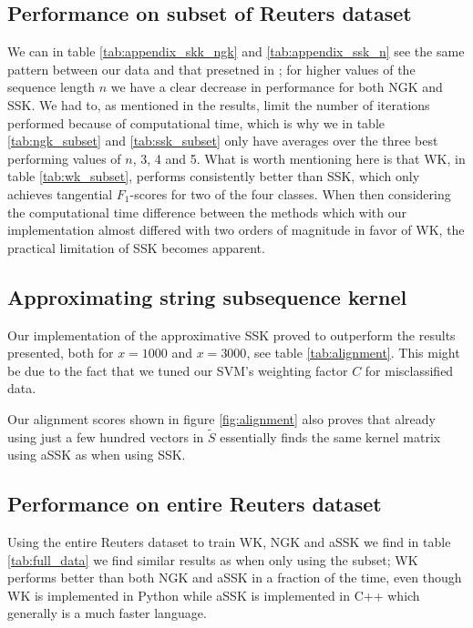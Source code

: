 \subsection{Performance on subset of Reuters dataset}
We can in table \ref{tab:appendix_skk_ngk} and \ref{tab:appendix_ssk_n} see the same pattern between our data and that presetned in \cite{lodhi}; for higher values of the sequence length $ n $ we have a clear decrease in performance for both NGK and SSK. We had to, as mentioned in the results, limit the number of iterations performed because of computational time, which is why we in table \ref{tab:ngk_subset} and \ref{tab:ssk_subset} only have averages over the three best performing values of $ n $, 3, 4 and 5. What is worth mentioning here is that WK, in table \ref{tab:wk_subset}, performs consistently better than SSK, which only achieves tangential $ F_1 $-scores for two of the four classes. When then considering the computational time difference between the methods which with our implementation almost differed with two orders of magnitude in favor of WK, the practical limitation of SSK becomes apparent. 

\subsection{Approximating string subsequence kernel}
Our implementation of the approximative SSK proved to outperform the results \cite{lodhi} presented, both for $ x=1000 $ and $ x=3000 $, see table \ref{tab:alignment}. This might be due to the fact that we tuned our SVM's weighting factor $ C $ for misclassified data. 

Our alignment scores shown in figure \ref{fig:alignment} also proves that already using just a few hundred vectors in $ \tilde{S} $ essentially finds the same kernel matrix using aSSK as when using SSK.

\subsection{Performance on entire Reuters dataset}
Using the entire Reuters dataset to train WK, NGK and aSSK we find in table \ref{tab:full_data} we find similar results as when only using the subset; WK performs better than both NGK and aSSK in a fraction of the time, even though WK is implemented in Python while aSSK is implemented in C++ which generally is a much faster language. 


